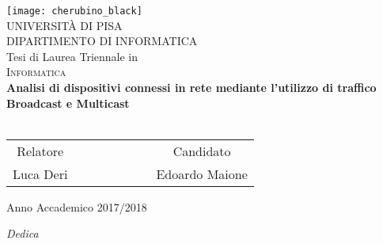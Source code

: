 \clearpage{\pagestyle{empty}\cleardoublepage}


\begin{titlepage}
 \begin{center}
     \texttt{[image: cherubino\_black]}\\
     \vspace{1em}
     {\Large \textsc{UNIVERSIT\`A DI PISA}}\\
     \vspace{1em}
     {\Large \textsc{DIPARTIMENTO DI INFORMATICA}}\\
     \vspace{2em}
     {\normalsize Tesi di Laurea Triennale in}\\
     \vspace{1em}
     {\Large \textsc{Informatica}}\\
     \vspace{5em}
     {\LARGE \textbf{Analisi di dispositivi connessi in rete mediante l'utilizzo di traffico \\Broadcast e Multicast}}\\
     \vspace{1em}
     {\LARGE \textbf{}}\\
 \end{center}

\vskip 2.5cm
  \begin{center}
    \begin{tabular}{c c c c c c c c}
      Relatore & & & & & & & Candidato \\[0.2cm]
      \large{Luca Deri} & & & & & & & \large{Edoardo Maione}\\[0.4cm]
    \end{tabular}
  \end{center}

\vskip 2cm
\begin{center}
{\normalsize Anno Accademico 2017/2018}
\end{center}
\end{titlepage}

\clearpage{\pagestyle{empty}\cleardoublepage}


\vspace{5em}
\begin{flushright}
{\Large \textit{Dedica}}
\end{flushright}

\clearpage{\pagestyle{empty}\cleardoublepage}
